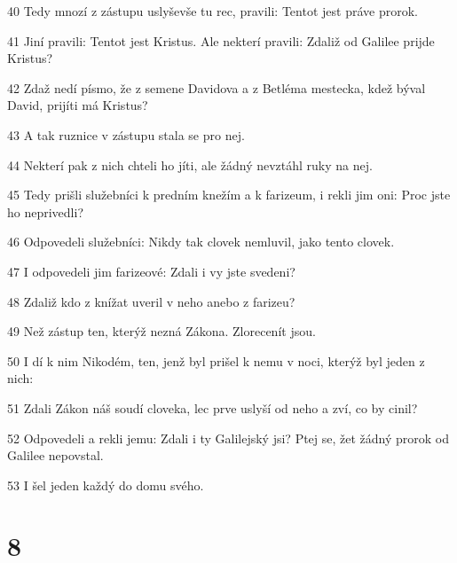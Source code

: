\par 40 Tedy mnozí z zástupu uslyševše tu rec, pravili: Tentot jest práve prorok.
\par 41 Jiní pravili: Tentot jest Kristus. Ale nekterí pravili: Zdaliž od Galilee prijde Kristus?
\par 42 Zdaž nedí písmo, že z semene Davidova a z Betléma mestecka, kdež býval David, prijíti má Kristus?
\par 43 A tak ruznice v zástupu stala se pro nej.
\par 44 Nekterí pak z nich chteli ho jíti, ale žádný nevztáhl ruky na nej.
\par 45 Tedy prišli služebníci k predním knežím a k farizeum, i rekli jim oni: Proc jste ho neprivedli?
\par 46 Odpovedeli služebníci: Nikdy tak clovek nemluvil, jako tento clovek.
\par 47 I odpovedeli jim farizeové: Zdali i vy jste svedeni?
\par 48 Zdaliž kdo z knížat uveril v neho anebo z farizeu?
\par 49 Než zástup ten, kterýž nezná Zákona. Zlorecenít jsou.
\par 50 I dí k nim Nikodém, ten, jenž byl prišel k nemu v noci, kterýž byl jeden z nich:
\par 51 Zdali Zákon náš soudí cloveka, lec prve uslyší od neho a zví, co by cinil?
\par 52 Odpovedeli a rekli jemu: Zdali i ty Galilejský jsi? Ptej se, žet žádný prorok od Galilee nepovstal.
\par 53 I šel jeden každý do domu svého.

\chapter{8}

